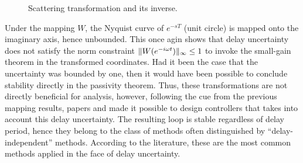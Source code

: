 \begin{figure}%
\centering
{}
\caption[Scattering transformation and its inverse.]{Scattering transformation and its inverse.}%
\label{lit:syn:invscat}%
\end{figure}


Under the mapping $W$, the Nyquist curve of $e^{-sT}$ (unit circle) is mapped onto the imaginary axis, 
hence unbounded. This once agin shows that delay uncertainty does not satisfy the norm constraint
$\|W(e^{-i\omega t})\|_\infty \leq 1$ to invoke the small-gain theorem in the transformed coordinates. 
Had it been the case that the uncertainty was bounded by one, then it would have been possible to 
conclude stability directly in the passivity theorem. Thus, these transformations are not directly 
beneficial for analysis, however, following the cue from the previous mapping results, papers 
\cite{andersonspong} and \cite{nieslotine} 
made it possible to design controllers that takes into account this delay uncertainty. The resulting 
loop is stable regardless of delay period, hence they belong to the class of methods often distinguished
by ``delay-independent'' methods. According to the literature, these are the most common methods
applied in the face of delay uncertainty.

